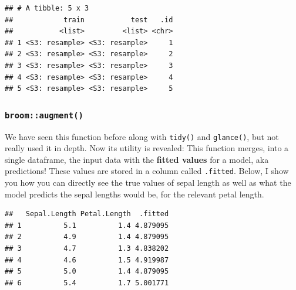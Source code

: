 \documentclass[]{article}
\newenvironment{Shaded}{\begin{snugshade}}{\end{snugshade}}
\newcommand{\KeywordTok}[1]{\textcolor[rgb]{0.13,0.29,0.53}{\textbf{#1}}}
\newcommand{\DataTypeTok}[1]{\textcolor[rgb]{0.13,0.29,0.53}{#1}}
\newcommand{\DecValTok}[1]{\textcolor[rgb]{0.00,0.00,0.81}{#1}}
\newcommand{\StringTok}[1]{\textcolor[rgb]{0.31,0.60,0.02}{#1}}
\newcommand{\OperatorTok}[1]{\textcolor[rgb]{0.81,0.36,0.00}{\textbf{#1}}}
\newcommand{\NormalTok}[1]{#1}
\begin{document}
\begin{Shaded}
\end{Shaded}

\begin{verbatim}
## # A tibble: 5 x 3
##            train           test   .id
##           <list>         <list> <chr>
## 1 <S3: resample> <S3: resample>     1
## 2 <S3: resample> <S3: resample>     2
## 3 <S3: resample> <S3: resample>     3
## 4 <S3: resample> <S3: resample>     4
## 5 <S3: resample> <S3: resample>     5
\end{verbatim}

\subsubsection{\texorpdfstring{\texttt{broom::augment()}}{broom::augment()}}\label{broomaugment}

We have seen this function before along with \texttt{tidy()} and
\texttt{glance()}, but not really used it in depth. Now its utility is
revealed: This function merges, into a single dataframe, the input data
with the \textbf{fitted values} for a model, aka predictions! These
values are stored in a column called \texttt{.fitted}. Below, I show you
how you can directly see the true values of sepal length as well as what
the model predicts the sepal lengths would be, for the relevant petal
length.

\begin{Shaded}
\end{Shaded}

\begin{verbatim}
##   Sepal.Length Petal.Length  .fitted
## 1          5.1          1.4 4.879095
## 2          4.9          1.4 4.879095
## 3          4.7          1.3 4.838202
## 4          4.6          1.5 4.919987
## 5          5.0          1.4 4.879095
## 6          5.4          1.7 5.001771
\end{verbatim}
\end{document}
